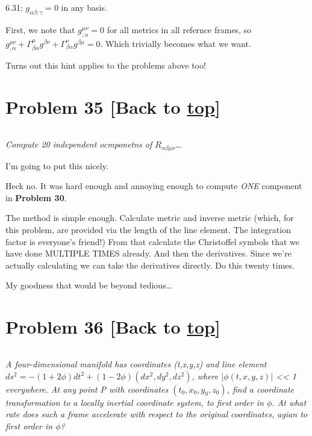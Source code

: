 \documentclass[landscape,letterpaper,10pt,english]{article}
\begin{document}
6.31: \(g_{\alpha\beta;\gamma}=0\) in any basis.

    First, we note that \(g^{\mu\nu}_{;\alpha}=0\) for all metrics in all
refernce frames, so
\(g^{\mu\nu}_{,\alpha} + \Gamma^\mu_{\beta\alpha}g^{\beta\nu} + \Gamma^\nu_{\beta\alpha}g^{\beta\mu} = 0\).
Which trivially becomes what we want.

Turns out this hint applies to the problems above too!

    \hypertarget{problem-35-back-to-top}{%
\section{\texorpdfstring{Problem 35 {[}Back to
\hyperref[toc]{top}{]}}{Problem 35 {[}Back to {]}}}\label{problem-35-back-to-top}}

\[\label{P35}\]

\emph{Compute 20 independent ocmponetns of
\(R_{\alpha\beta\mu\nu}\)\ldots{}}

I'm going to put this nicely.

Heck no. It was hard enough and annoying enough to compute \emph{ONE}
component in \textbf{Problem 30}.

The method is simple enough. Calculate metric and inverse metric (which,
for this problem, are provided via the length of the line element. The
integration factor is everyone's friend!) From that calculate the
Christoffel symbols that we have done MULTIPLE TIMES already. And then
the derivatives. Since we're actually calculating we can take the
derivatives directly. Do this twenty times.

My goodness that would be beyond tedious\ldots{}

    \hypertarget{problem-36-back-to-top}{%
\section{\texorpdfstring{Problem 36 {[}Back to
\hyperref[toc]{top}{]}}{Problem 36 {[}Back to {]}}}\label{problem-36-back-to-top}}

\[\label{P36}\]

\emph{A four-dimensional manifold has coordinates (t,x,y,z) and line
element \(ds^2 = -(1+2\phi)dt^2 + (1-2\phi)(dx^2,dy^2,dz^2)\), where
\(|\phi(t,x,y,z)|\) \textless\textless{} 1 everywhere. At any point P
with coordinates \((t_0,x_0,y_0,z_0)\), find a coordinate transformation
to a locally inertial coordinate system, to first order in \(\phi\). At
what rate does such a frame accelerate with respect to the original
coordinates, agian to first order in \(\phi\)?}
\end{document}
